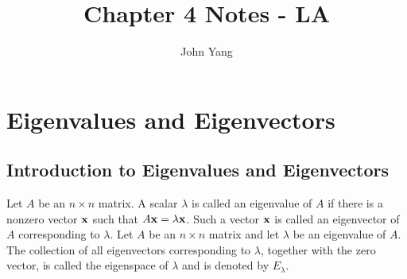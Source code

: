 \documentclass{article}
\title{Chapter 4 Notes - LA} %
\author{John Yang}
\begin{document}
    \maketitle
    \tableofcontents
    \section{Eigenvalues and Eigenvectors} %
    \subsection{Introduction to Eigenvalues and Eigenvectors} %
    \begin{outline}
        \1 Let $A$ be an \(n\times n\) matrix. A scalar \(\lambda\) is called an eigenvalue of $A$ if there is a nonzero vector \(\vb x\) such that \(A\vb x=\lambda\vb x\). Such a vector \(\vb x\) is called an eigenvector of $A$ corresponding to \(\lambda\). 
        \1 Let $A$ be an \(n\times n\) matrix and let \(\lambda\) be an eigenvalue of $A$. The collection of all eigenvectors corresponding to \(\lambda\), together with the zero vector, is called the eigenspace of \(\lambda\) and is denoted by \(E_\lambda\). 
    \end{outline}
\end{document}
